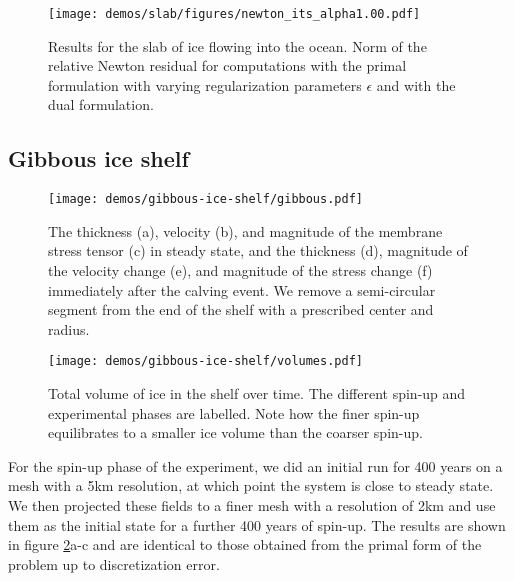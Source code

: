 \documentclass[review,oneside]{igs}
\begin{document}
\begin{figure}[h]
    \centering
    \texttt{[image: demos/slab/figures/newton\_its\_alpha1.00.pdf]}
    \caption{Results for the slab of ice flowing into the ocean. Norm of the relative Newton residual for computations with the primal formulation with varying regularization parameters $\epsilon$ and with the dual formulation.}
    \label{fig:newton-its}
\end{figure}


\subsection{Gibbous ice shelf} \label{sec:gibbous-ice-shelf}

\begin{figure}[h]
    \begin{center}
        \texttt{[image: demos/gibbous-ice-shelf/gibbous.pdf]}
    \end{center}
    \caption{The thickness (a), velocity (b), and magnitude of the membrane stress tensor (c) in steady state, and the thickness (d), magnitude of the velocity change (e), and magnitude of the stress change (f) immediately after the calving event.
    We remove a semi-circular segment from the end of the shelf with a prescribed center and radius.}
    \label{fig:gibbous}
\end{figure}

\begin{figure}[h]
    \begin{center}
        \texttt{[image: demos/gibbous-ice-shelf/volumes.pdf]}
    \end{center}
    \caption{Total volume of ice in the shelf over time.
    The different spin-up and experimental phases are labelled.
    Note how the finer spin-up equilibrates to a smaller ice volume than the coarser spin-up.}
    \label{fig:gibbous-calving-volumes}
\end{figure}

For the spin-up phase of the experiment, we did an initial run for 400 years on a mesh with a 5km resolution, at which point the system is close to steady state.
We then projected these fields to a finer mesh with a resolution of 2km and use them as the initial state for a further 400 years of spin-up.
The results are shown in figure \ref{fig:gibbous}a-c and are identical to those obtained from the primal form of the problem up to discretization error.
\end{document}
